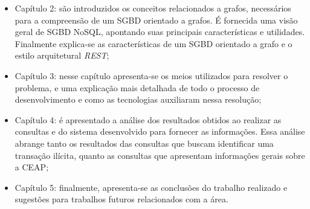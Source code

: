 	\begin{itemize}
		\item Capítulo 2: são introduzidos os conceitos relacionados a grafos, necessários para a compreensão de um SGBD orientado a grafos. É fornecida uma visão geral de SGBD NoSQL, apontando suas principais características e utilidades. Finalmente explica-se as características de um SGBD orientado a grafo e o estilo arquitetural \textit{REST};
		\item Capítulo 3: nesse capítulo apresenta-se os meios utilizados para resolver o problema, e uma explicação mais detalhada de todo o processo de desenvolvimento e como as tecnologias auxiliaram nessa resolução;
		\item Capítulo 4: é apresentado a análise dos resultados obtidos ao realizar as consultas e do sistema desenvolvido para fornecer as informações. Essa análise abrange tanto os resultados das consultas que buscam identificar uma transação ilícita, quanto as consultas que apresentam informações gerais sobre a CEAP;
		\item Capítulo 5: finalmente, apresenta-se as conclusões do trabalho realizado e sugestões para trabalhos futuros relacionados com a área.
	\end{itemize}
